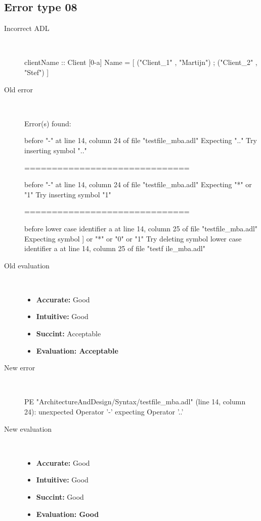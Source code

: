 \hrulefill

\subsection{Error type 08}
  \begin{description}
  \item[Incorrect ADL]~\\
\begin{adl}
clientName :: Client [0-a] Name =
    [ ("Client_1"      , "Martijn")
    ; ("Client_2"      , "Stef")
    ]\end{adl}
  \item[Old error]~\\
\begin{haskell}
Error(s) found:

before "-" at line 14, column 24 of file "testfile_mba.adl"
Expecting ".."
Try inserting symbol ".."

==============================

before "-" at line 14, column 24 of file "testfile_mba.adl"
Expecting "*" or "1"
Try inserting symbol "1"

==============================

before lower case identifier a at line 14, column 25 of file "testfile_mba.adl"
Expecting symbol ] or "*" or "0" or "1"
Try deleting symbol lower case identifier a at line 14, column 25 of file "testf
ile_mba.adl"\end{haskell}
  \item[Old evaluation]~\\
    \begin{itemize}
    \item \textbf{Accurate:} Good
    \item \textbf{Intuitive:} Good
    \item \textbf{Succint:} Acceptable
    \item \textbf{Evaluation: Acceptable}
    \end{itemize}
  \item[New error]~\\
\begin{haskell}
PE "ArchitectureAndDesign/Syntax/testfile_mba.adl" (line 14, column 24):
unexpected Operator '-'
expecting Operator '..'
\end{haskell}
  \item[New evaluation]~\\
    \begin{itemize}
    \item \textbf{Accurate:} Good
    \item \textbf{Intuitive:} Good
    \item \textbf{Succint:} Good
    \item \textbf{Evaluation: Good
}
    \end{itemize}
  \end{description}

